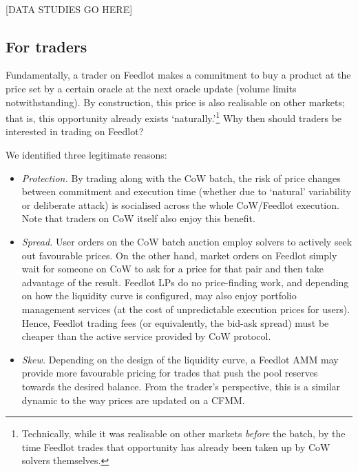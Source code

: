 \documentclass[a4paper,10pt]{article}
\theoremstyle{remark}
\begin{document}
\

\begin{center}[DATA STUDIES GO HERE]\end{center}

\subsection{For traders}

Fundamentally, a trader on Feedlot makes a commitment to buy a product at the price set by a certain oracle at the next oracle update (volume limits notwithstanding).
%
By construction, this price is also realisable on other markets; that is, this opportunity already exists `naturally.'\footnote{Technically, while it was realisable on other markets \emph{before} the batch, by the time Feedlot trades that opportunity has already been taken up by CoW solvers themselves.}
%
Why then should traders be interested in trading on Feedlot?

We identified three legitimate reasons:
\begin{itemize}
  \item 
    \emph{Protection.} By trading along with the CoW batch, the risk of price changes between commitment and execution time (whether due to `natural' variability or deliberate attack) is socialised across the whole CoW/Feedlot execution.
    Note that traders on CoW itself also enjoy this benefit.
    
  \item
    \emph{Spread.} User orders on the CoW batch auction employ solvers to actively seek out favourable prices. On the other hand, market orders on Feedlot simply wait for someone on CoW to ask for a price for that pair and then take advantage of the result.
    Feedlot LPs do no price-finding work, and depending on how the liquidity curve is configured, may also enjoy portfolio management services (at the cost of unpredictable execution prices for users).
    Hence, Feedlot trading fees (or equivalently, the bid-ask spread) must be cheaper than the active service provided by CoW protocol.
    
  \item
    \emph{Skew.} Depending on the design of the liquidity curve, a Feedlot AMM may provide more favourable pricing for trades that push the pool reserves towards the desired balance.
    From the trader's perspective, this is a similar dynamic to the way prices are updated on a CFMM.

\end{itemize}
\end{document}
